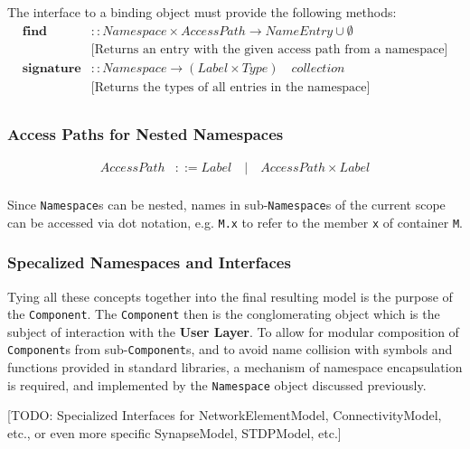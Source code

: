 \documentclass[a4paper]{article}
\newcommand\nmlClass[1]{{\tt #1}}
\begin{document}
The interface to a binding object must provide the following methods:
\begin{equation*}
\begin{array}{ll}
   \mathbf{find}  & :: Namespace \times AccessPath \rightarrow
   NameEntry \cup \emptyset \\
   & \textrm{[Returns an entry with the given access path from a namespace]} \\
   \mathbf{signature}  & :: Namespace \rightarrow (Label \times Type) \quad collection \\
   & \textrm{[Returns the types of all entries in the namespace]} \\
\end{array}
\end{equation*}

\subsubsection{Access Paths for Nested Namespaces}

\begin{equation*}
\begin{array}{ll}
   AccessPath & ::= Label  \quad \lvert \quad AccessPath \times Label \\
\end{array}
\end{equation*}

Since \nmlClass{Namespace}s can be nested, names in
sub-\nmlClass{Namespace}s of the current scope can be accessed via dot
notation, e.g. \verb^M.x^ to refer to the member \verb^x^ of container
\verb^M^.

\subsubsection{Specalized Namespaces and Interfaces}

Tying all these concepts together into the final resulting model is
the purpose of the \nmlClass{Component}.  The \nmlClass{Component} then is the
conglomerating object which is the subject of interaction with the
\textbf{User Layer}.  To allow for modular composition of \nmlClass{Component}s
from sub-\nmlClass{Component}s, and to avoid name collision with symbols and
functions provided in standard libraries, a mechanism of namespace
encapsulation is required, and implemented by the \nmlClass{Namespace} object discussed previously.

[TODO: Specialized Interfaces for NetworkElementModel, ConnectivityModel, etc., or even more specific SynapseModel, STDPModel, etc.]
\end{document}
